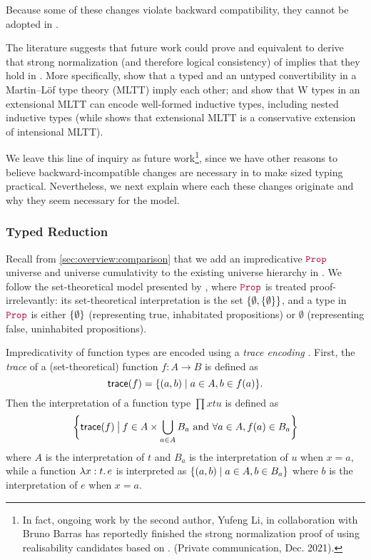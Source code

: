 Because some of these changes violate backward compatibility, they cannot be
adopted in \lang.

The literature suggests that future work could prove \langAnother and \lang
equivalent to derive that strong normalization (and therefore logical
consistency) of \langAnother implies that they hold in \lang.
More specifically, \cite{conversion} show that a typed and an untyped convertibility in a Martin--L\"of type theory (MLTT) imply each other;
and \citet{w-types, polynomial-functors-w} show that W types in an extensional MLTT
can encode well-formed inductive types, including nested inductive types
(while \citet{hofmann} shows that extensional MLTT is a conservative extension of intensional MLTT).

We leave this line of inquiry as future work\footnote{In fact, ongoing work by
  the second author, Yufeng Li, in collaboration with Bruno Barras has reportedly
  finished the strong normalization proof of \langAnother using realisability
  candidates based on \citet{barras-thesis}. (Private
  communication, Dec. 2021).}, since we have other reasons to believe backward-incompatible
  changes are necessary in \lang to make sized typing practical.
Nevertheless, we next explain where each these changes originate and why they
seem necessary for the model.

\subsubsection{Typed Reduction}

Recall from \autoref{sec:overview:comparison} that we add an impredicative $\Prop$ universe
and universe cumulativity to the existing universe hierarchy in \CIChatminus.
We follow the set-theoretical model presented by \citet{not-so-simple-cc},
where $\Prop$ is treated proof-irrelevantly:
its set-theoretical interpretation is the set $\{\emptyset, \{\emptyset\}\}$,
and a type in $\Prop$ is either $\{\emptyset\}$ (representing true, inhabitated propositions)
or $\emptyset$ (representing false, uninhabited propositions).

Impredicativity of function types are encoded using a \emph{trace encoding} \citep{aczel-trace}.
First, the \emph{trace} of a (set-theoretical) function $f : A \to B$ is defined as
$$\textsf{trace}(f) = \{(a, b) \mid a \in A, b \in f(a)\}.$$
Then the interpretation of a function type $\prod{x}{t}{u}$ is defined as
$$\bigg\{\textsf{trace}(f) \mathbin{\big|} f \in A \times \bigcup_{a \in A} B_a \text{ and } \forall a \in A, f(a) \in B_a\bigg\}$$
where $A$ is the interpretation of $t$ and $B_a$ is the interpretation of $u$ when $x = a$,
while a function $\lambda x : t \mathpunct{.} e$ is interpreted as
$\{(a, b) \mid a \in A, b \in B_a\}$
where $b$ is the interpretation of $e$ when $x = a$.

